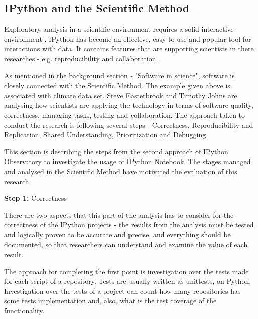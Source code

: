 \subsection{IPython and the Scientific Method}

Exploratory analysis in a scientific environment requires a solid interactive environment \cite{ipythonArticle}. IPython has become an effective, easy to use and popular tool for interactions with data. It contains features that are supporting scientists in there researches - e.g. reproducibility and collaboration. 

As mentioned in the background section - "Software in science", software is closely connected with the Scientific Method\cite{sciMethod}. The example given above is associated with climate data set. Steve Easterbrook and Timothy Johns \cite{easterbrook2009engineering} are analysing how scientists are applying the technology in terms of software quality, correctness, managing tasks, testing and collaboration. The approach taken to conduct the research is following several steps - Correctness, Reproducibility and Replication, Shared Understanding, Prioritization and Debugging.

This section is describing the steps from the second approach of IPython Observatory to investigate the usage of IPython Notebook. The stages managed and analysed in the Scientific Method have motivated the evaluation of this research.


\vspace{5mm}
\begin{mdframed}
\vspace{1px}
\textbf{Step 1:} Correctness
\vspace{1px}
\end{mdframed}
\vspace{2mm}

There are two aspects that this part of the analysis has to consider for the correctness of the IPython projects - the results from the analysis must be tested and logically proven to be accurate and precise, and everything should be documented, so that researchers can understand and examine the value of each result. 

The approach for completing the first point is investigation over the tests made for each script of a repository. Tests are usually written as unittests, on Python. Investigation over the tests of a project can count how many repositories has some tests implementation and, also, what is the test coverage of the functionality.

